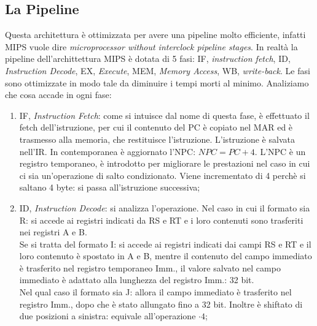 \documentclass{article}
\begin{document}
\subsection{La Pipeline}
Questa architettura è ottimizzata per avere una pipeline molto efficiente, infatti MIPS vuole dire \textit{microprocessor without interclock pipeline stages}. In realtà la pipeline dell'archittettura MIPS è dotata di 5 fasi: IF, \textit{instruction fetch}, ID, \textit{Instruction Decode}, EX, \textit{Execute}, MEM, \textit{Memory Access}, WB, \textit{write-back}. Le fasi sono ottimizzate in modo tale da diminuire i tempi morti al minimo.
Analiziamo che cosa accade in ogni fase:
\begin{enumerate}
	\item IF, \textit{Instruction Fetch}: come si intuisce dal nome di questa fase, è effettuato il fetch dell'istruzione, per cui il contenuto del PC è copiato nel MAR ed è trasmesso alla memoria, che restituisce l'istruzione. L'istruzione è salvata nell'IR. In contemporanea è aggiornato l'NPC: $NPC = PC + 4$. L'NPC è un registro temporaneo, è introdotto per migliorare le prestazioni nel caso in cui ci sia un'operazione di salto condizionato. Viene incrementato di 4 perchè si saltano 4 byte: si passa all'istruzione successiva;

	\item ID, \textit{Instruction Decode}: si analizza l'operazione. Nel caso in cui il formato sia R: si accede ai registri indicati da RS e RT e i loro contenuti sono trasferiti nei registri A e B.\\
	Se si tratta del formato I: si accede ai registri indicati dai campi RS e RT e il loro contenuto è spostato in A e B, mentre il contenuto del campo immediato è trasferito nel registro temporaneo Imm., il valore salvato nel campo immediato è adattato alla lunghezza del registro Imm.: 32 bit.\\
	Nel qual caso il formato sia J: allora il campo immediato è trasferito nel registro Imm., dopo che è stato allungato fino a 32 bit. Inoltre è shiftato di due posizioni a sinistra: equivale all'operazione $\cdot 4$;


\end{enumerate}
\end{document}
